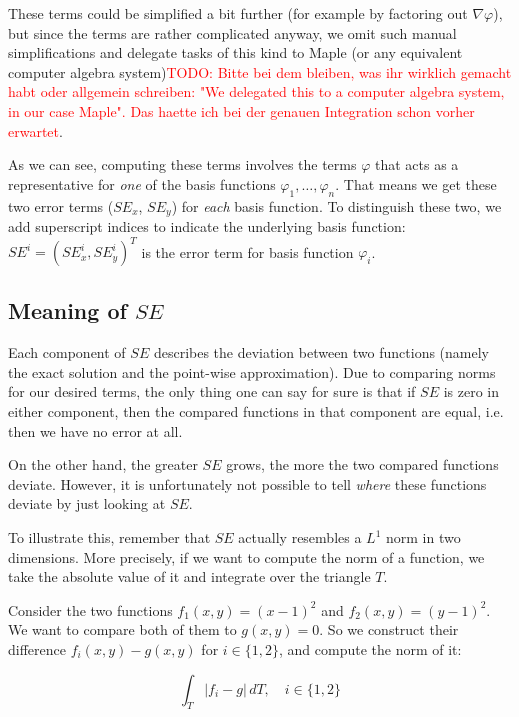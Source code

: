 \documentclass{article}
\newcommand{\todo}[2][]{\textcolor{red}{TODO\ifthenelse{\equal{#1}{}}{}{[#1]}: #2}}
\renewcommand{\phi}{\varphi}
\begin{document}
These terms could be simplified a bit further (for example by factoring out $\nabla \phi$), but since the terms are rather complicated anyway, we omit such manual simplifications and delegate tasks of this kind to Maple (or any equivalent computer algebra system)\todo{Bitte bei dem bleiben, was ihr wirklich gemacht habt oder allgemein schreiben: "We delegated this to a computer algebra system, in our case Maple". Das haette ich bei der genauen Integration schon vorher erwartet}.

As we can see, computing these terms involves the terms $\phi$ that acts as a representative for \emph{one} of the basis functions $\phi_1,\dots,\phi_n$. That means we get these two error terms ($SE_x$, $SE_y$) for \emph{each} basis function. To distinguish these two, we add superscript indices to indicate the underlying basis function: $SE^i= \left(SE_x^i, SE_y^i\right)^T$ is the error term for basis function $\phi_i$.

\subsection{\texorpdfstring{Meaning of $SE$}{Meaning of SE}}
\label{sec:stiffness-analysis-what-does-se-mean}

Each component of $SE$ describes the deviation between two functions (namely the exact solution and the point-wise approximation). Due to comparing norms for our desired terms, the only thing one can say for sure is that if $SE$ is zero in either component, then the compared functions in that component are equal, i.e. then we have no error at all.

On the other hand, the greater $SE$ grows, the more the two compared functions deviate. However, it is unfortunately not possible to tell \emph{where} these functions deviate by just looking at $SE$.

To illustrate this, remember that $SE$ actually resembles a $L^1$ norm in two dimensions. More precisely, if we want to compute the norm of a function, we take the absolute value of it and integrate over the triangle $T$.

Consider the two functions $f_1(x,y)=(x-1)^2$ and $f_2(x,y)=(y-1)^2$. We want to compare both of them to $g(x,y)=0$. So we construct their difference $f_i(x,y)-g(x,y)$ for $i\in\{1,2\}$, and compute the norm of it:

\begin{equation*}
  \int_T \left| f_i - g \right| \, dT, \quad i \in \{1,2 \}
\end{equation*}
\end{document}
